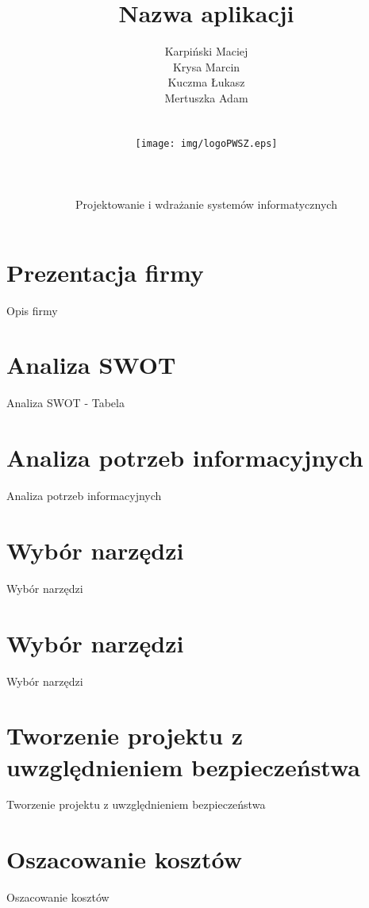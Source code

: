 \documentclass[12pt,a4paper]{article}
\author{Karpiński Maciej\\Krysa Marcin\\Kuczma Łukasz\\Mertuszka Adam\\\\\\\texttt{[image: img/logoPWSZ.eps]}\\\\\\\\Projektowanie i wdrażanie systemów informatycznych}
\title{Nazwa aplikacji}
\begin{document}
	\maketitle
	\thispagestyle{empty}
	\clearpage

	\tableofcontents
	\newpage

	\section{Prezentacja firmy}
		\indent Opis firmy
	\newpage

	\section{Analiza SWOT}
		\indent Analiza SWOT - Tabela
	\newpage
	
	\section{Analiza potrzeb informacyjnych}
		\indent Analiza potrzeb informacyjnych
	\newpage
	
	\section{Wybór narzędzi}
		\indent Wybór narzędzi
	\newpage

	\section{Wybór narzędzi}
		\indent Wybór narzędzi
	\newpage
	
	\section{Tworzenie projektu z uwzględnieniem bezpieczeństwa}
		\indent Tworzenie projektu z uwzględnieniem bezpieczeństwa
	\newpage
	
	\section{Oszacowanie kosztów}
		\indent Oszacowanie kosztów
	\newpage
	
\end{document}
